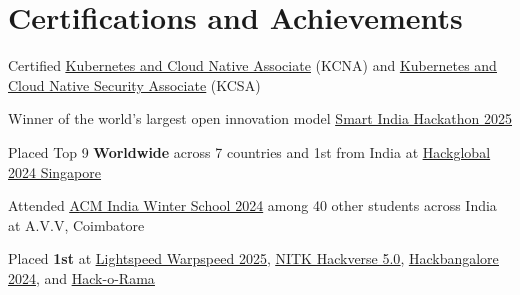 \documentclass[a4paper,11pt]{article}
\begin{document}
\section{Certifications and Achievements}
\begin{description}[font=$\bullet$]
\item Certified \underline{\href{https://www.credly.com/badges/33d7b8d2-56e1-4306-84cb-611798ee73c5/public_url}{Kubernetes and Cloud Native Associate}} (KCNA) and \underline{\href{https://www.credly.com/badges/3b9a90d4-7882-4b6d-896e-2cebdc1cbab0/public_url}{Kubernetes and Cloud Native Security Associate}} (KCSA)
\vspace{-5pt}

\item {Winner of the world's largest open innovation model \underline{\href{https://www.linkedin.com/posts/skysingh04_llvmsocial-activity-7405463989889175552-GXfn}{Smart India Hackathon 2025}}}
\vspace{-5pt}
\item {Placed Top 9 \textbf{Worldwide} across 7 countries and 1st from  India at \underline{\href{https://www.linkedin.com/posts/skysingh04_hackglobal-switch2024-singapore-activity-7257330477970141184-g7VD?utm_source=share&utm_medium=member_desktop}{Hackglobal 2024 Singapore}}}
\vspace{-5pt}
\item {Attended \underline{\href{https://www.linkedin.com/posts/skysingh04_datastructures-algorithms-computationalbiology-activity-7279458705241161728-5Un1?utm_source=social_share_send&utm_medium=member_desktop_web&rcm=ACoAAD57BKMBQzryaT68XVOOZuDcpVBBayHGg1U}ACM India Winter School 2024} among 40 other students across India at A.V.V, Coimbatore}
\vspace{-5pt}
\item {Placed \textbf{1st} at \underline{\href{https://www.linkedin.com/posts/skysingh04_ai-devops-hackathon-activity-7344326141861666817-1O4m?utm_source=social_share_send&utm_medium=member_desktop_web&rcm=ACoAAD57BKMBQzryaT68XVOOZuDcpVBBayHGg1U}{Lightspeed Warpspeed 2025}}, \underline{\href{https://www.linkedin.com/posts/skysingh04_hackverse6-nitksuratkal-grandwinners-activity-7285302212522647553-v0hC?utm_source=share&utm_medium=member_desktop}{NITK Hackverse 5.0}}, \underline{\href{https://www.linkedin.com/posts/akash-singh-a57081253_everyoneisashark-hackbangalore-everyoneisashark-activity-7195865460859416577-k-Mu?utm_source=share&utm_medium=member_desktop}{Hackbangalore 2024}}, and \underline{\href{https://www.linkedin.com/posts/akash-singh-a57081253_hackorama-ai-ml-activity-7155577685312745472-r8Sm?utm_source=share&utm_medium=member_desktop}{Hack-o-Rama}}}
\vspace{-5pt}
\end{description}
\end{document}
